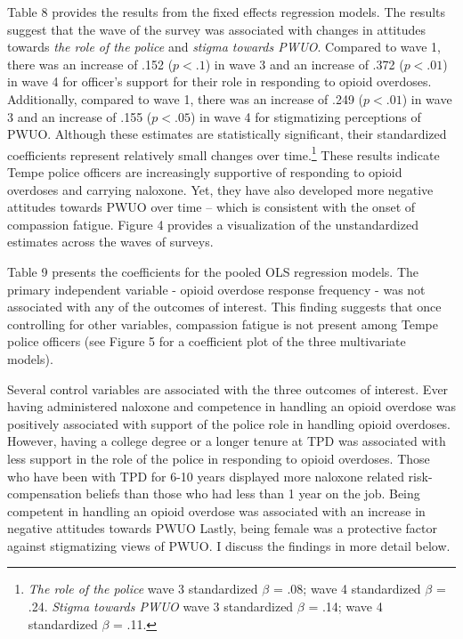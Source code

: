 Table 8 provides the results from the fixed effects regression models. The results suggest that the wave of the survey was associated with changes in attitudes towards \textit{the role of the police} and \textit{stigma towards PWUO}. Compared to wave 1, there was an increase of .152 (\(p < .1\)) in wave 3 and an increase of .372 (\(p < .01\)) in wave 4 for officer's support for their role in responding to opioid overdoses. Additionally, compared to wave 1, there was an increase of .249 (\(p < .01\)) in wave 3 and an increase of .155 (\(p < .05\)) in wave 4 for stigmatizing perceptions of PWUO. Although these estimates are statistically significant, their standardized coefficients represent relatively small changes over time.\footnote{\textit{The role of the police} wave 3 standardized \(\beta\) = .08; wave 4 standardized \(\beta\) = .24. \textit{Stigma towards PWUO} wave 3 standardized \(\beta\) = .14; wave 4 standardized \(\beta\) = .11.} These results indicate Tempe police officers are increasingly supportive of responding to opioid overdoses and carrying naloxone. Yet, they have also developed more negative attitudes towards PWUO over time – which is consistent with the onset of compassion fatigue. Figure 4 provides a visualization of the unstandardized estimates across the waves of surveys. 

Table 9 presents the coefficients for the pooled OLS regression models. The primary independent variable - opioid overdose response frequency - was not associated with any of the outcomes of interest. This finding suggests that once controlling for other variables, compassion fatigue is not present among Tempe police officers (see Figure 5 for a coefficient plot of the three multivariate models).

Several control variables are associated with the three outcomes of interest. Ever having administered naloxone and competence in handling an opioid overdose was positively associated with support of the police role in handling opioid overdoses. However, having a college degree or a longer tenure at TPD was associated with less support in the role of the police in responding to opioid overdoses. Those who have been with TPD for 6-10 years displayed more naloxone related risk-compensation beliefs than those who had less than 1 year on the job. Being competent in handling an opioid overdose was associated with an increase in negative attitudes towards PWUO Lastly, being female was a protective factor against stigmatizing views of PWUO. I discuss the findings in more detail below. 


